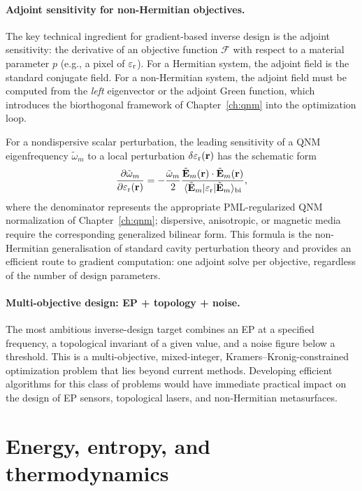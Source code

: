 \paragraph{Adjoint sensitivity for non-Hermitian objectives.}
The key technical ingredient for gradient-based inverse design is the
adjoint sensitivity: the derivative of an objective function $\mathcal{F}$
with respect to a material parameter $p$ (e.g., a pixel of $\varepsilon_{\mathrm{r}}$).
For a Hermitian system, the adjoint field is the standard conjugate
field. For a non-Hermitian system, the adjoint field must be computed
from the \emph{left} eigenvector or the adjoint Green function, which
introduces the biorthogonal framework of Chapter~\ref{ch:qnm} into the
optimization loop.

For a nondispersive scalar perturbation, the leading sensitivity of a
QNM eigenfrequency $\tilde{\omega}_m$ to a local perturbation
$\delta\varepsilon_{\mathrm{r}}(\mathbf{r})$ has the schematic form
\begin{equation}
 \frac{\partial\tilde{\omega}_m}{\partial\varepsilon_{\mathrm{r}}(\mathbf{r})}
 = -\frac{\tilde{\omega}_m}{2}
 \frac{\tilde{\mathbf{E}}_m(\mathbf{r}) \cdot \tilde{\mathbf{E}}_m(\mathbf{r})}
 {\langle\tilde{\mathbf{E}}_m | \varepsilon_{\mathrm{r}} | \tilde{\mathbf{E}}_m\rangle_{\mathrm{bi}}},
 \label{eq:qnm-sensitivity}
\end{equation}
where the denominator represents the appropriate PML-regularized QNM
normalization of Chapter~\ref{ch:qnm}; dispersive, anisotropic, or
magnetic media require the corresponding generalized bilinear form.
This formula is the non-Hermitian generalisation of standard cavity
perturbation theory and provides an efficient route to gradient
computation: one adjoint solve per objective, regardless of the number
of design parameters.

\paragraph{Multi-objective design: EP + topology + noise.}
The most ambitious inverse-design target combines an EP at a specified
frequency, a topological invariant of a given value, and a noise figure
below a threshold. This is a multi-objective, mixed-integer,
Kramers--Kronig-constrained optimization problem that lies beyond
current methods. Developing efficient algorithms for this class of
problems would have immediate practical impact on the design of EP
sensors, topological lasers, and non-Hermitian metasurfaces.


\section{Energy, entropy, and thermodynamics}
\label{sec:thermodynamics}

